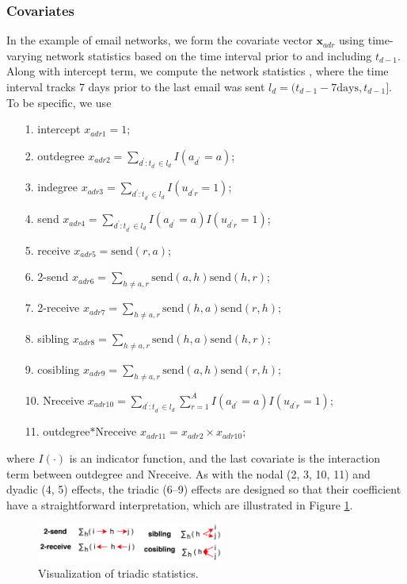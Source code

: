 \documentclass[12pt]{article}
\begin{document}
 	   \subsubsection{Covariates}\label{subsec:Covariates_email}
	In the example of email networks, we form the covariate vector $\boldsymbol{x}_{adr}$ using time-varying network statistics based on the time interval prior to and including $t_{d-1}$. Along with intercept term, we compute the network statistics \citep{PerryWolfe2012}, where the time interval tracks 7 days prior to the last email was sent $l_d = (t_{d-1}-7\mbox{days}, t_{d-1}]$. To be specific, we use
	\begin{itemize}
		\item[1.] intercept ${x}_{adr1} =1$;
		\item[2.] outdegree ${x}_{adr2} =\sum\limits_{d^\prime: t_{d^\prime} \in l_d} I(a_{d^\prime} = a)$;
		\item[3.] indegree ${x}_{adr3}=\sum\limits_{d^\prime: t_{d^\prime} \in l_d} I(u_{d^\prime r} = 1)$;
		\item[4.] send ${x}_{adr4}=\sum\limits_{d^\prime: t_{d^\prime} \in l_d} I(a_{d^\prime} = a)I(u_{d^\prime r} = 1)$;
		\item[5.] receive ${x}_{adr5}=\mbox{send}(r,a)$;
		\item[6.] 2-send ${x}_{adr6} = \sum\limits_{h \neq a, r} \mbox{send}(a,h)\mbox{send}(h,r)$;
		\item[7.] 2-receive ${x}_{adr7}= \sum\limits_{h \neq a, r} \mbox{send}(h,a)\mbox{send}(r,h)$;
		\item[8.] sibling ${x}_{adr8}=\sum\limits_{h \neq a, r} \mbox{send}(h,a)\mbox{send}(h,r)$;
		\item[9.] cosibling ${x}_{adr9}=\sum\limits_{h \neq a, r} \mbox{send}(a,h)\mbox{send}(r,h)$;
		\item[10.] Nreceive ${x}_{adr10}=\sum\limits_{d^\prime: t_{d^\prime} \in l_d} \sum\limits_{r=1}^A I(a_{d^\prime} = a)I(u_{d^\prime r} = 1)$;
		\item[11.] outdegree$*$Nreceive ${x}_{adr11} = {x}_{adr2}\times{x}_{adr10};$
	\end{itemize}
	where $I(\cdot)$ is an indicator function, and the last covariate is the interaction term between outdegree and Nreceive. As with the nodal (2, 3, 10, 11) and dyadic (4, 5) effects, the triadic (6--9) effects are designed so that their coefficient have a straightforward interpretation, which are illustrated in Figure \ref{figure:netstats}.
		\begin{figure}[H]
			\centering
			\includegraphics[width=0.55\textwidth]{plots_paper/triad.png}	
			\caption {Visualization of triadic statistics.}
			\label{figure:netstats}
		\end{figure}
\end{document}
